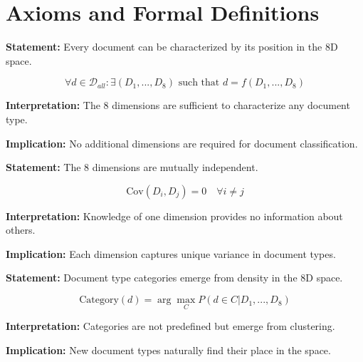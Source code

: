 \section{Axioms and Formal Definitions}
\label{sec:doctype-axioms}

\begin{tcolorbox}[colback=gray!5!white, colframe=gray!75!black,
    title=Axiom DOC-1: Dimension Completeness]
\textbf{Statement:} Every document can be characterized by its position in the 8D space.

\begin{equation}
\forall d \in \mathcal{D}_{all}: \exists (D_1, ..., D_8) \text{ such that } d = f(D_1, ..., D_8)
\end{equation}

\textbf{Interpretation:} The 8 dimensions are sufficient to characterize any document type.

\textbf{Implication:} No additional dimensions are required for document classification.
\end{tcolorbox}

\begin{tcolorbox}[colback=gray!5!white, colframe=gray!75!black,
    title=Axiom DOC-2: Dimension Independence]
\textbf{Statement:} The 8 dimensions are mutually independent.

\begin{equation}
\text{Cov}(D_i, D_j) = 0 \quad \forall i \neq j
\end{equation}

\textbf{Interpretation:} Knowledge of one dimension provides no information about others.

\textbf{Implication:} Each dimension captures unique variance in document types.
\end{tcolorbox}

\begin{tcolorbox}[colback=gray!5!white, colframe=gray!75!black,
    title=Axiom DOC-3: Cluster Emergence]
\textbf{Statement:} Document type categories emerge from density in the 8D space.

\begin{equation}
\text{Category}(d) = \arg\max_C P(d \in C | D_1, ..., D_8)
\end{equation}

\textbf{Interpretation:} Categories are not predefined but emerge from clustering.

\textbf{Implication:} New document types naturally find their place in the space.
\end{tcolorbox}


